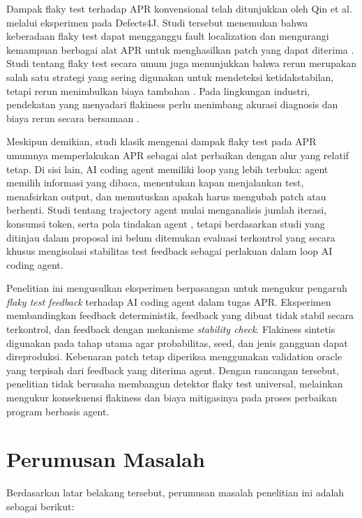 Dampak flaky test terhadap APR konvensional telah ditunjukkan oleh Qin et al. melalui eksperimen pada Defects4J. Studi tersebut menemukan bahwa keberadaan flaky test dapat mengganggu fault localization dan mengurangi kemampuan berbagai alat APR untuk menghasilkan patch yang dapat diterima \cite{qin2021flaky}. Studi tentang flaky test secara umum juga menunjukkan bahwa rerun merupakan salah satu strategi yang sering digunakan untuk mendeteksi ketidakstabilan, tetapi rerun menimbulkan biaya tambahan \cite{parry2022flaky,tahir2023flakiness}. Pada lingkungan industri, pendekatan yang menyadari flakiness perlu menimbang akurasi diagnosis dan biaya rerun secara bersamaan \cite{flakeaware2023}.

Meskipun demikian, studi klasik mengenai dampak flaky test pada APR umumnya memperlakukan APR sebagai alat perbaikan dengan alur yang relatif tetap. Di sisi lain, AI coding agent memiliki loop yang lebih terbuka: agent memilih informasi yang dibaca, menentukan kapan menjalankan test, menafsirkan output, dan memutuskan apakah harus mengubah patch atau berhenti. Studi tentang trajectory agent mulai menganalisis jumlah iterasi, konsumsi token, serta pola tindakan agent \cite{bouzenia2025trajectories}, tetapi berdasarkan studi yang ditinjau dalam proposal ini belum ditemukan evaluasi terkontrol yang secara khusus mengisolasi stabilitas test feedback sebagai perlakuan dalam loop AI coding agent.

Penelitian ini mengusulkan eksperimen berpasangan untuk mengukur pengaruh \textit{flaky test feedback} terhadap AI coding agent dalam tugas APR. Eksperimen membandingkan feedback deterministik, feedback yang dibuat tidak stabil secara terkontrol, dan feedback dengan mekanisme \textit{stability check}. Flakiness sintetis digunakan pada tahap utama agar probabilitas, seed, dan jenis gangguan dapat direproduksi. Kebenaran patch tetap diperiksa menggunakan validation oracle yang terpisah dari feedback yang diterima agent. Dengan rancangan tersebut, penelitian tidak berusaha membangun detektor flaky test universal, melainkan mengukur konsekuensi flakiness dan biaya mitigasinya pada proses perbaikan program berbasis agent.

\section{Perumusan Masalah}

Berdasarkan latar belakang tersebut, perumusan masalah penelitian ini adalah sebagai berikut:

